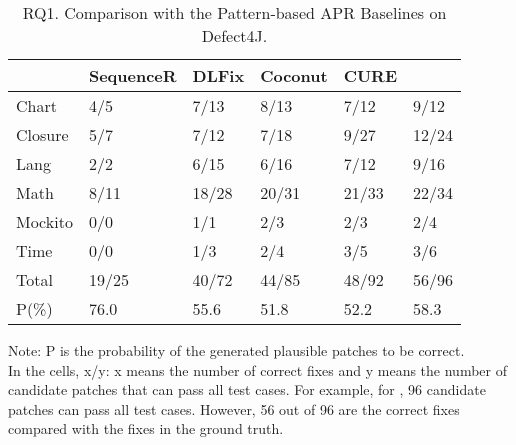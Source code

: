 		\begin{table}[t]
			\caption{RQ1. Comparison with the Pattern-based APR Baselines on Defect4J.}
			\begin{center}
				\renewcommand{\arraystretch}{1}
				\begin{tabular}{p{0.9cm}<{\centering}|p{1.4cm}<{\centering}|p{1cm}<{\centering}|p{1cm}<{\centering}|p{1cm}<{\centering}|p{1cm}<{\centering}}
					
					\hline
					&\textbf{SequenceR}&\textbf{DLFix}& \textbf{Coconut}&\textbf{CURE}&\textbf{\tool}\\
					\hline
					Chart  & 4/5   & 7/13  & 8/13  & 7/12   & 9/12\\
					Closure& 5/7   & 7/12  & 7/18  & 9/27   & 12/24\\
					Lang   & 2/2   & 6/15  & 6/16  & 7/12   & 9/16\\
					Math    & 8/11  & 18/28 & 20/31 & 21/33  & 22/34\\
					Mockito & 0/0   & 1/1   & 2/3   & 2/3    & 2/4\\
					Time    & 0/0   & 1/3   & 2/4   & 3/5    & 3/6\\
					\hline
					Total   & 19/25 & 40/72 & 44/85 & 48/92  & 56/96\\
					\hline
					P(\%)  & 76.0  & 55.6  & 51.8  & 52.2   & 58.3\\
					\hline
				\end{tabular}
			{\footnotesize{
				Note: P is the probability of the generated plausible patches to be correct.\\
				In the cells, x/y: x means the number of correct fixes and y means the number of candidate patches that can pass all test cases. For example, for \tool, 96 candidate patches can pass all test cases. However, 56 out of 96 are the correct fixes compared with the fixes in the ground truth.}}
				\label{RQ1_defect4j}
			\end{center}
		\end{table}




















